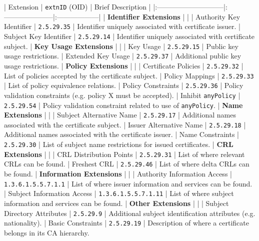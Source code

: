 | Extension                    | \texttt{extnID} (OID)       | Brief Description |
|:-----------------------------|:---------------------|:------------------|
| \textbf{Identifier Extensions}    |                      |
| Authority Key Identifier     | \texttt{2.5.29.35}          | Identifier uniquely associated with certificate issuer.
| Subject Key Identifier       | \texttt{2.5.29.14}          | Identifier uniquely associated with certificate subject.
| \textbf{Key Usage Extensions}     |                      |
| Key Usage                    | \texttt{2.5.29.15}          | Public key usage restrictions.
| Extended Key Usage           | \texttt{2.5.29.37}          | Additional public key usage restrictions.
| \textbf{Policy Extensions}        |                      |
| Certificate Policies         | \texttt{2.5.29.32}          | List of policies accepted by the certificate subject.
| Policy Mappings              | \texttt{2.5.29.33}          | List of policy equivalence relations.
| Policy Constraints           | \texttt{2.5.29.36}          | Policy validation constraints (e.g. policy X must be accepted).
| Inhibit \texttt{anyPolicy}          | \texttt{2.5.29.54}          | Policy validation constraint related to use of \texttt{anyPolicy}.
| \textbf{Name Extensions}          |                      |
| Subject Alternative Name     | \texttt{2.5.29.17}          | Additional names associated with the certificate subject.
| Issuer Alternative Name      | \texttt{2.5.29.18}          | Additional names associated with the certificate issuer.
| Name Constraints             | \texttt{2.5.29.30}          | List of subject name restrictions for issued certificates.
| \textbf{CRL Extensions}           |                      |
| CRL Distribution Points      | \texttt{2.5.29.31}          | List of where relevant CRLs can be found.
| Freshest CRL                 | \texttt{2.5.29.46}          | List of where delta CRLs can be found.
| \textbf{Information Extensions}   |                      |
| Authority Information Access | \texttt{1.3.6.1.5.5.7.1.1}  | List of where issuer information and services can be found.
| Subject Information Access   | \texttt{1.3.6.1.5.5.7.1.11} | List of where subject information and services can be found.
| \textbf{Other Extensions}         |                      |
| Subject Directory Attributes | \texttt{2.5.29.9}           | Additional subject identification attributes (e.g. nationality).
| Basic Constraints            | \texttt{2.5.29.19}          | Description of where a certificate belongs in its CA hierarchy.

